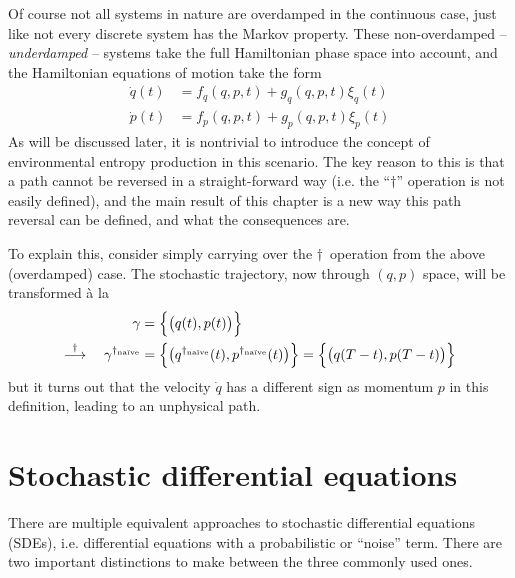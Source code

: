 Of course not all systems in nature are overdamped in the continuous case, just like not every discrete system has the Markov property. These non-overdamped -- \emph{underdamped} -- systems take the full Hamiltonian phase space into account, and the Hamiltonian equations of motion take the form
%
\begin{equation}\begin{split}
	\label{eqn:general hamiltonian equations}
	\dot q(t) &= f_q(q,p,t) + g_q(q,p,t)\xi_q(t) \\
	\dot p(t) &= f_p(q,p,t) + g_p(q,p,t)\xi_p(t)
\end{split}\end{equation}
%
As will be discussed later, it is nontrivial to introduce the concept of environmental entropy production in this scenario. The key reason to this is that a path cannot be reversed in a straight-forward way (i.e. the ``\(\dagger\)'' operation is not easily defined), and the main result of this chapter is a new way this path reversal can be defined, and what the consequences are.

To explain this, consider simply carrying over the \(\dagger\)~operation from the above (overdamped) case. The stochastic trajectory, now through \((q,p)\) space, will be transformed \`a la
%
\begin{equation}\begin{split}
	\gamma &= \Bigl\{\bigl(q(t),p(t)\bigr)\Bigr\}
	\\ \overset\dagger\longrightarrow \quad
	\gamma^{\dagger_\text{na\"ive}}
		&= \Bigl\{\bigl(q^{\dagger_\text{na\"ive}}(t),p^{\dagger_\text{na\"ive}}(t)\bigr)\Bigr\}
		= \Bigl\{\bigl(q(T-t),p(T-t)\bigr)\Bigr\}
\end{split}\end{equation}
%
but it turns out that the velocity \(\dot q\) has a different sign as momentum \(p\) in this definition, leading to an unphysical path.








\section{Stochastic differential equations}
\label{sec:sde}

There are multiple equivalent approaches to stochastic differential equations (SDEs), i.e. differential equations with a probabilistic or ``noise'' term. There are two important distinctions to make between the three commonly used ones.

